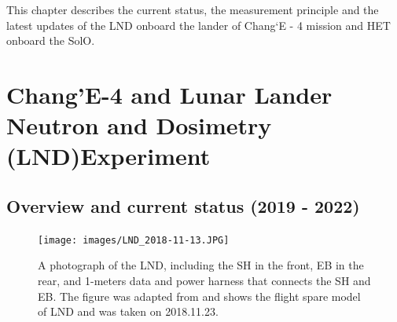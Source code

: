 This chapter describes the current status, the measurement principle and the latest updates of the \ac{LND} onboard the lander of Chang`E - 4 mission and \ac{HET} onboard the \ac{SolO}. 

\section{Chang'E-4 and Lunar Lander Neutron and Dosimetry (LND)Experiment}
\label{sec:change_4_LND}

\subsection*{Overview and current status (2019 - 2022)}

\begin{figure}
    \centering
    \texttt{[image: images/LND\_2018-11-13.JPG]}
    \caption[A photograph of the \ac{LND}]{A photograph of the \ac{LND}, including the \ac{SH} in the front, \ac{EB} in the rear, and 1-meters data and power harness that connects the \ac{SH} and \ac{EB}. The figure was adapted from \citet{Wimmer2020SSRv} and shows the flight spare model of LND and was taken on 2018.11.23.}
    \label{Fig:LND_instrument}
\end{figure}


